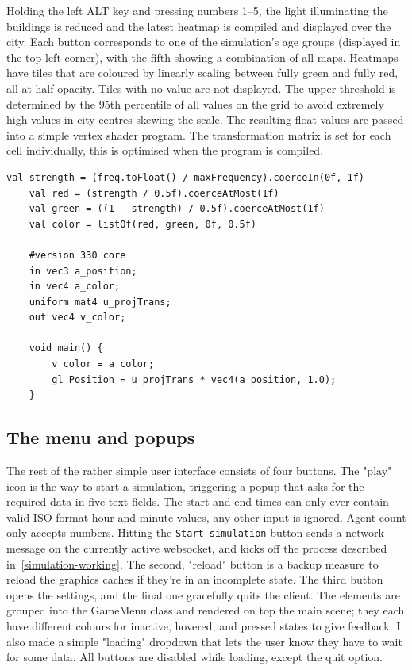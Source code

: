 Holding the left ALT key and pressing numbers 1--5, the light illuminating the buildings is reduced and the latest heatmap is compiled and displayed over the city. Each button corresponds to one of the simulation's age groups (displayed in the top left corner), with the fifth showing a combination of all maps. Heatmaps have tiles that are coloured by linearly scaling between fully green and fully red, all at half opacity. Tiles with no value are not displayed. The upper threshold is determined by the 95th percentile of all values on the grid to avoid extremely high values in city centres skewing the scale. The resulting float values are passed into a simple vertex shader program. The transformation matrix is set for each cell individually, this is optimised when the program is compiled.

\begin{lstlisting}[caption=Cell colour calculation and the vertex shader program for heatmap cells]
    val strength = (freq.toFloat() / maxFrequency).coerceIn(0f, 1f)
    val red = (strength / 0.5f).coerceAtMost(1f)
    val green = ((1 - strength) / 0.5f).coerceAtMost(1f)
    val color = listOf(red, green, 0f, 0.5f)

    #version 330 core
    in vec3 a_position;
    in vec4 a_color;
    uniform mat4 u_projTrans;
    out vec4 v_color;

    void main() {
        v_color = a_color;
        gl_Position = u_projTrans * vec4(a_position, 1.0);
    }
\end{lstlisting}




\subsection{The menu and popups}

The rest of the rather simple user interface consists of four buttons. The "play" icon is the way to start a simulation, triggering a popup that asks for the required data in five text fields. The start and end times can only ever contain valid ISO format hour and minute values, any other input is ignored. Agent count only accepts numbers. Hitting the \verb|Start simulation| button sends a network message on the currently active websocket, and kicks off the process described in~\ref{simulation-working}. The second, "reload" button is a backup measure to reload the graphics caches if they're in an incomplete state. The third button opens the settings, and the final one gracefully quits the client. The elements are grouped into the GameMenu class and rendered on top the main scene; they each have different colours for inactive, hovered, and pressed states to give feedback. I also made a simple "loading" dropdown that lets the user know they have to wait for some data. All buttons are disabled while loading, except the quit option.

